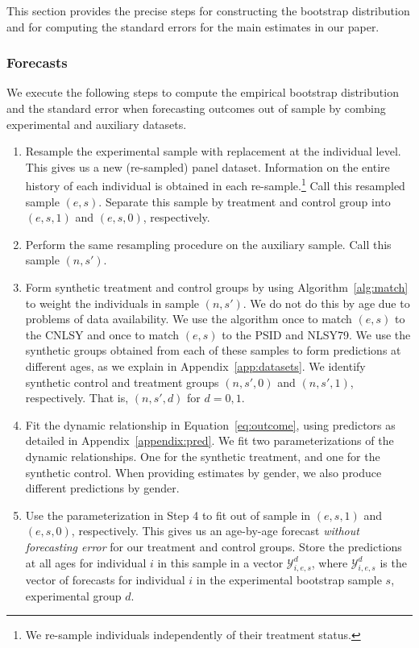 \noindent This section provides the precise steps for constructing the bootstrap distribution and for computing the standard errors for the main estimates in our paper.

\subsubsection{Forecasts} \label{appendix:bootstrapspreds}

\noindent We execute the following steps to compute the empirical bootstrap distribution and the standard error when forecasting outcomes out of sample by combing experimental and auxiliary datasets.

\begin{enumerate}
\item Resample the experimental sample with replacement at the individual level. This gives us a new (re-sampled) panel dataset. Information on the entire history of each individual is obtained in each re-sample.\footnote{We re-sample individuals independently of their treatment status.} Call this resampled sample $(e,s)$. Separate this sample by treatment and control group into $(e,s,1)$ and $(e,s,0)$, respectively.

\item Perform the same resampling procedure on the auxiliary sample. Call this sample $(n,s')$.

\item Form synthetic treatment and control groups by using Algorithm~\ref{alg:match} to weight the individuals in sample $(n,s')$. We do not do this by age due to problems of data availability. We use the algorithm once to match $(e,s)$ to the CNLSY and once to match $(e,s)$ to the PSID and NLSY79. We use the synthetic groups obtained from each of these samples to form predictions at different ages, as we explain in Appendix~\ref{app:datasets}. We identify synthetic control and treatment groups $(n,s',0)$ and $(n,s',1)$, respectively. That is, $(n,s',d)$ for $d = {0,1}$.

\item Fit the dynamic relationship in Equation~\eqref{eq:outcome}, using predictors as detailed in Appendix~\ref{appendix:pred}. We fit two parameterizations of the dynamic relationships. One for the synthetic treatment, and one for the synthetic control. When providing estimates by gender, we also produce different predictions by gender.

\item Use the parameterization in Step 4 to fit out of sample in $(e,s,1)$ and $(e,s,0)$, respectively. This gives us an age-by-age forecast \textit{without forecasting error} for our treatment and control groups. Store the predictions at all ages for individual $i$ in this sample in a vector $\mathcal{Y}_{i,e,s}^d$, where $\mathcal{Y}_{i,e,s}^d$ is the vector of forecasts for individual $i$ in the experimental bootstrap sample $s$, experimental group $d$.


\end{enumerate}

